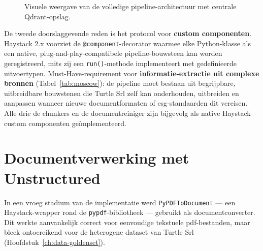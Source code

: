 \begin{figure}[H]
{%
    }
    \caption{Visuele weergave van de volledige pipeline-architectuur met centrale Qdrant-opslag.}
    \label{fig:pipeline-flow}
\end{figure}

De tweede doorslaggevende reden is het protocol voor \textbf{custom componenten}. Haystack 2.x voorziet de \texttt{@component}-decorator waarmee elke Python-klasse als een native, plug-and-play-compatibele pipeline-bouwsteen kan worden geregistreerd, mits zij een \texttt{run()}-methode implementeert met gedefinieerde uitvoertypen. Must-Have-requirement voor \textbf{informatie-extractie uit complexe bronnen} (Tabel~\ref{tab:moscow}): de pipeline moet bestaan uit begrijpbare, uitbreidbare bouwstenen die Turtle Srl zelf kan onderhouden, uitbreiden en aanpassen wanneer nieuwe documentformaten of \gls{esg}-standaarden dit vereisen. Alle drie de chunkers en de documentreiniger zijn bijgevolg als native Haystack custom componenten geïmplementeerd.

\section{Documentverwerking met Unstructured}
\label{sec:documentverwerking}

In een vroeg stadium van de implementatie werd \texttt{PyPDFToDocument} — een Haystack-wrapper rond de \texttt{pypdf}-bibliotheek — gebruikt als documentconverter. Dit werkte aanvankelijk correct voor eenvoudige tekstuele \gls{pdf}-bestanden, maar bleek ontoereikend voor de heterogene dataset van Turtle Srl (Hoofdstuk~\ref{ch:data-goldenset}).

